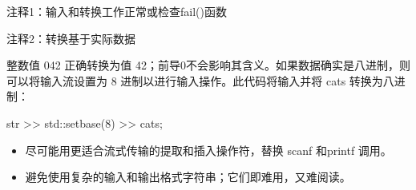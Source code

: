 {\footnotesize
注释1：输入和转换工作正常或检查fail()函数

注释2：转换基于实际数据
}

整数值 042 正确转换为值 42；前导0不会影响其含义。如果数据确实是八进制，则可以将输入流设置为 8 进制以进行输入操作。此代码将输入并将 cats 转换为八进制：

\begin{cpp}
str >> std::setbase(8) >> cats;
\end{cpp}


\begin{itemize}
\item
尽可能用更适合流式传输的提取和插入操作符，替换 scanf 和printf 调用。

\item
避免使用复杂的输入和输出格式字符串；它们即难用，又难阅读。
\end{itemize}
